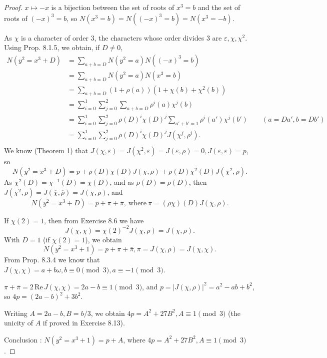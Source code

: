 \documentclass[11pt,a4paper]{article}
\begin{document}
{\begin{proof}
$x \mapsto -x$ is a bijection between the set of roots of $x^3 = b$ and the set of roots of $(-x)^3 = b$, so $N(x^3 = b) = N((-x)^3 = b) = N(x^3 = -b)$. 

As $\chi$ is a character of order 3, the characters whose order divides 3 are $\varepsilon,\chi,\chi^2$. Using Prop. 8.1.5, we obtain, if $D\ne 0$,
\begin{align*}
N(y^2=x^3+D)  &= \sum\limits_{a+b=D} N(y^2=a) N((-x)^3 = b)\\
&= \sum\limits_{a+b=D} N(y^2=a) N(x^3=b)\\
&= \sum\limits_{a+b=D}(1+\rho(a))(1+\chi(b)+\chi^2(b))\\
&=\sum\limits_{i=0}^1\sum\limits_{j=0}^2\sum\limits_{a+b=D} \rho^i(a) \chi^j(b)\\
&=\sum\limits_{i=0}^1\sum\limits_{j=0}^2\rho(D)^i \chi(D)^j\sum\limits_{a'+b'=1} \rho^i(a') \chi^j(b')\qquad (a = Da', b = D b')\\
&=\sum\limits_{i=0}^1\sum\limits_{j=0}^2\rho(D)^i \chi(D)^j J(\chi^j,\rho^i).\\
\end{align*}
We know (Theorem 1) that  $J(\chi,\varepsilon)=J(\chi^2,\varepsilon)=J(\varepsilon,\rho)=0, J(\varepsilon,\varepsilon)=p$, so
$$N(y^2=x^3+D) = p + \rho(D)\chi(D) J(\chi,\rho) + \rho(D) \chi^2(D) J(\chi^2,\rho).$$
As $\chi^2(D) = \chi^{-1}(D) = \overline{\chi(D)}$, and as $\overline{\rho(D)} = \rho(D)$, then $J(\chi^2,\rho) =  J(\overline{\chi},\overline{\rho}) = \overline{J(\chi,\rho)}$, and
$$N(y^2 = x^3+D) = p +\pi + \bar{\pi},\ \mathrm{where}\ \pi = (\rho \chi)(D) J(\chi,\rho).$$

If  $\chi(2)=1$, then from Exercise 8.6 we have
$$J(\chi,\chi) = \chi(2)^{-2} J(\chi,\rho) = J(\chi,\rho).$$
With $D = 1$ (if $\chi(2)=1$), we obtain
$$N(y^2=x^3+1) = p+\pi +\bar{\pi}, \pi = J(\chi,\rho) = J(\chi,\chi).$$
From Prop. 8.3.4 we know that  $J(\chi,\chi) = a + b\omega, b\equiv0 \pmod 3, a \equiv-1\pmod 3$.

$ \pi+ \overline{\pi} = 2\, \mathrm{Re}\, J(\chi,\chi) =2a-b \equiv 1 \pmod 3$, and $p = |J(\chi,\rho)|^2 = a^2-ab+b^2$, so $4p =(2a-b)^2 + 3b^2$.

Writing $A=2a-b, B=b/3$, we obtain $4p = A^2+27B^2,A\equiv1 \pmod 3$ (the unicity of $A$ if proved in Exercise 8.13).

Conclusion : $N(y^2=x^3+1) = p+A$, where $4p = A^2+27B^2, A\equiv1 \pmod 3$.

\bigskip


\end{proof}}
\end{document}
